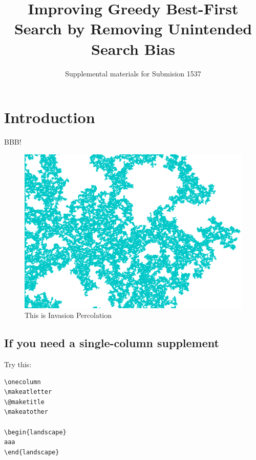 

\usepackage{pdflscape}
\renewcommand{\thesection}{S\arabic{section}}
\renewcommand{\thetable}{S\arabic{table}}
\renewcommand{\thefigure}{S\arabic{figure}}

\pagestyle{empty}

\author{Supplemental materials for Submision 1537}
\title{Improving Greedy Best-First Search by Removing Unintended Search Bias}

\maketitle

\section{Introduction}

BBB!  \cite{Asai2016}

\begin{figure}[tb]
 \includegraphics[width=\linewidth]{img/static/ip.png}
 \caption{This is Invasion Percolation}
 \label{fig:ip-supplement}
\end{figure}

\subsection{If you need a single-column supplement}

Try this:

\begin{verbatim}
\onecolumn
\makeatletter
\@maketitle
\makeatother

\begin{landscape}
aaa
\end{landscape}
\end{verbatim}

\fontsize{9.5pt}{10.5pt}
\selectfont
 



